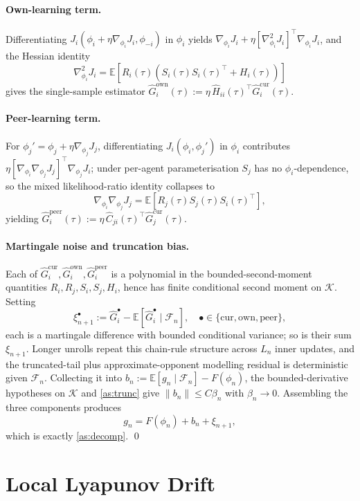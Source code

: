 \documentclass{article}
\theoremstyle{plain}
\theoremstyle{definition}
\theoremstyle{remark}
\newcommand{\E}{\mathbb{E}}
\newcommand{\K}{\mathcal{K}}
\newcommand{\F}{\mathcal{F}}
\begin{document}
\paragraph{Own-learning term.}
Differentiating $J_i(\phi_i+\eta\nabla_{\phi_i}J_i,\phi_{-i})$ in $\phi_i$ yields
$\nabla_{\phi_i}J_i+\eta[\nabla_{\phi_i}^2J_i]^\top\nabla_{\phi_i}J_i$, and the Hessian identity
\[
\nabla_{\phi_i}^2J_i
=\E\!\left[R_i(\tau)\!\left(S_i(\tau)S_i(\tau)^\top+H_i(\tau)\right)\right]
\]
gives the single-sample estimator
$\widehat G_i^{\mathrm{own}}(\tau):=\eta\,\widehat H_{ii}(\tau)^\top\widehat G_i^{\mathrm{cur}}(\tau)$.

\paragraph{Peer-learning term.}
For $\phi_j'=\phi_j+\eta\nabla_{\phi_j}J_j$, differentiating $J_i(\phi_i,\phi_j')$ in $\phi_i$ contributes
$\eta[\nabla_{\phi_i}\nabla_{\phi_j}J_j]^\top\nabla_{\phi_j}J_i$; under per-agent parameterisation $S_j$ has no $\phi_i$-dependence, so the mixed likelihood-ratio identity collapses to
\[
\nabla_{\phi_i}\nabla_{\phi_j}J_j
=\E\!\left[R_j(\tau)S_j(\tau)S_i(\tau)^\top\right],
\]
yielding $\widehat G_i^{\mathrm{peer}}(\tau):=\eta\,\widehat C_{ji}(\tau)^\top\widehat G_j^{\mathrm{cur}}(\tau)$.

\paragraph{Martingale noise and truncation bias.}
Each of $\widehat G_i^{\mathrm{cur}},\widehat G_i^{\mathrm{own}},\widehat G_i^{\mathrm{peer}}$ is a polynomial in the bounded-second-moment quantities $R_i,R_j,S_i,S_j,H_i$, hence has finite conditional second moment on $\K$. Setting
\[
\xi_{n+1}^{\bullet}:=\widehat G_i^{\bullet}-\E[\widehat G_i^{\bullet}\mid\F_n],\quad \bullet\in\{\mathrm{cur},\mathrm{own},\mathrm{peer}\},
\]
each is a martingale difference with bounded conditional variance; so is their sum $\xi_{n+1}$. Longer unrolls repeat this chain-rule structure across $L_n$ inner updates, and the truncated-tail plus approximate-opponent modelling residual is deterministic given $\F_n$. Collecting it into $b_n:=\E[g_n\mid\F_n]-F(\phi_n)$, the bounded-derivative hypotheses on $\K$ and \cref{as:trunc} give $\|b_n\|\le C\beta_n$ with $\beta_n\to0$. Assembling the three components produces
\[
g_n=F(\phi_n)+b_n+\xi_{n+1},
\]
which is exactly \cref{as:decomp}. \qed

\section{Local Lyapunov Drift}\label{app:lyapunov}
\end{document}
